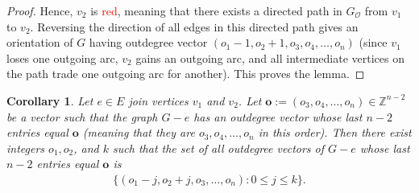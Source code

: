 \documentclass[12pt]{article}
\newtheorem{corollary}[theorem]{Corollary}
\theoremstyle{definition}
\theoremstyle{remark}
\newcommand{\Red}[1]{\textcolor{Red}{#1}}
\begin{document}
\begin{proof}
	Hence, $v_2$ is \Red{red}, meaning that there exists a directed path in $G_{\mathcal{O}}$ from $v_1$ to $v_2$. Reversing the direction of all edges in this directed path gives an orientation of $G$ having outdegree vector $(o_1-1,o_2+1,o_3,o_4,\ldots,o_n)$ (since $v_1$ loses one outgoing arc, $v_2$ gains an outgoing arc, and all intermediate vertices on the path trade one outgoing arc for another). This proves the lemma.
\end{proof}

\begin{corollary}\label{repeatcor}
    Let $e \in E$ join vertices $v_1$ and $v_2$.
	Let $\mathbf{o} := (o_3,o_4,\ldots,o_n) \in \mathbb{Z}^{n-2}$ be a vector such that the graph $G-e$ has an outdegree vector whose last $n-2$ entries equal $\mathbf{o}$ (meaning that they are $o_3,o_4,\ldots,o_n$ in this order).
	Then there exist integers $o_1,o_2$, and $k$ such that the set of all outdegree vectors of $G-e$ whose last $n-2$ entries equal $\mathbf{o}$ is \begin{align*}
        \{(o_1-j,o_2+j,o_3,\ldots,o_n) : 0 \leq j \leq k\}.
    \end{align*}
\end{corollary}
\end{document}

